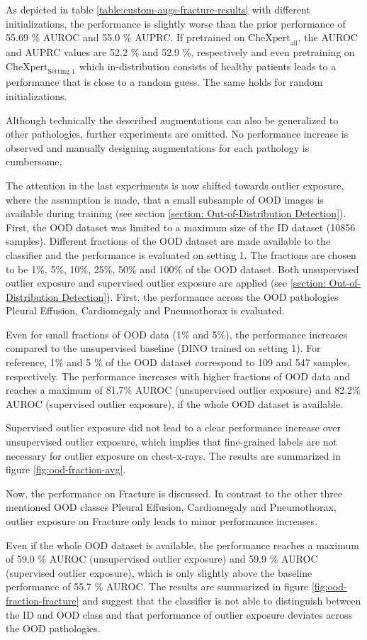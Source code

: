 \par
As depicted in table \ref{table:custom-augs-fracture-results} with different initializations, the performance is slightly worse than the prior performance of 55.69 \% AUROC  and 55.0 \% AUPRC.
If pretrained on $\text{CheXpert}_\text{all}$, the AUROC and AUPRC values are 52.2 \% and 52.9 \%, respectively and even pretraining on $\text{CheXpert}_\text{Setting 1}$ which in-distribution consists of healthy patients leads to a performance that is close to a random guess.
The same holds for random initializations.
\par
Although technically the described augmentations can also be generalized to other pathologies, further experiments are omitted.
No performance increase is observed and manually designing augmentations for each pathology is cumbersome.
\par
The attention in the last experiments is now shifted towards outlier exposure, where the assumption is made, that a small subsample of OOD images is available during training (see section \ref{section: Out-of-Distribution Detection}).
First, the OOD dataset was limited to a maximum size of the ID dataset (10856 samples).
Different fractions of the OOD dataset are made available to the classifier and the performance is evaluated on setting 1.
The fractions are chosen to be 1\%, 5\%, 10\%, 25\%, 50\% and 100\% of the OOD dataset.
Both unsupervised outlier exposure and supervised outlier exposure are applied (see \ref{section: Out-of-Distribution Detection}).
First, the performance across the OOD pathologies Pleural Effusion, Cardiomegaly and Pneumothorax is evaluated.
\par
Even for small fractions of OOD data (1\% and 5\%), the performance increases compared to the unsupervised baseline (DINO trained on setting 1).
For reference, 1\% and 5 \% of the OOD dataset correspond to 109 and 547 samples, respectively.
The performance increases with higher fractions of OOD data and reaches a maximum of 81.7\% AUROC (unsupervised outlier exposure) and 82.2\% AUROC (supervised outlier exposure), if the whole OOD dataset is available.
\par
Supervised outlier exposure did not lead to a clear performance increase over unsupervised outlier exposure, which implies that fine-grained labels are not necessary for outlier exposure on chest-x-rays.
The results are summarized in figure \ref{fig:ood-fraction-avg}.
\par
Now, the performance on Fracture is discussed.
In contrast to the other three mentioned OOD classes Pleural Effusion, Cardiomegaly and Pneumothorax, outlier exposure on Fracture only leads to minor performance increases.
\par
Even if the whole OOD dataset is available, the performance reaches a maximum of 59.0 \% AUROC (unsupervised outlier exposure) and 59.9 \% AUROC (supervised outlier exposure), which is only slightly above the baseline performance of 55.7 \% AUROC.
The results are summarized in figure \ref{fig:ood-fraction-fracture} and suggest that the classifier is not able to distinguish between the ID and OOD class and that performance of outlier exposure deviates across the OOD pathologies.  